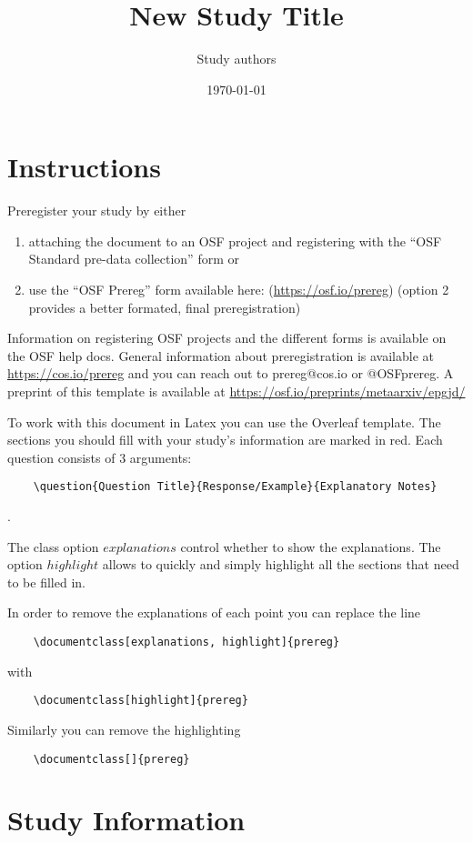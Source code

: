\documentclass[highlight, explanations]{prereg}
\title{New Study Title}
\author{Study authors}
\date{\today}
\begin{document}
\maketitle


\section{Instructions}
Preregister your study by either 
\begin{enumerate}
    \item attaching the document to an OSF project and registering with the “OSF Standard pre-data collection” form or
    \item use the “OSF Prereg” form available here: (\url{https://osf.io/prereg}) (option 2 provides a better formated, final preregistration) 
\end{enumerate}

Information on registering OSF projects and the different forms is available on the OSF help docs.
General information about preregistration is available at \url{https://cos.io/prereg} and you can reach out to prereg@cos.io or @OSFprereg. A preprint of this template is available at \url{https://osf.io/preprints/metaarxiv/epgjd/}

To work with this document in Latex you can use the Overleaf template. 
The sections you should fill with your study's information are marked in red. 
Each question consists of 3 arguments:
\begin{verbatim}
    \question{Question Title}{Response/Example}{Explanatory Notes}
\end{verbatim}.

The class option $explanations$ control whether to show the explanations. The option $highlight$ allows to quickly and simply highlight all the sections that need to be filled in.

In order to remove the explanations of each point you can replace the line
\begin{verbatim}
    \documentclass[explanations, highlight]{prereg}
\end{verbatim}
 with 
 \begin{verbatim}
    \documentclass[highlight]{prereg}
\end{verbatim}

Similarly you can remove the highlighting
\begin{verbatim}
    \documentclass[]{prereg}
\end{verbatim}


\section{Study Information}
\end{document}
